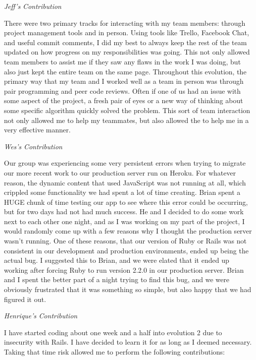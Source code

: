 \documentclass[11pt]{article}
\begin{document}
\textit{Jeff's Contribution}

There were two primary tracks for interacting with my team members: through project management tools and in person.  Using tools like Trello, Facebook Chat, and useful commit comments, I did my best to always keep the rest of the team updated on how progress on my responsibilities was going.  This not only allowed team members to assist me if they saw any flaws in the work I was doing, but also just kept the entire team on the same page.  Throughout this evolution, the primary way that my team and I worked well as a team in person was through pair programming and peer code reviews.  Often if one of us had an issue with some aspect of the project, a fresh pair of eyes or a new way of thinking about some specific algorithm quickly solved the problem.  This sort of team interaction not only allowed me to help my teammates, but also allowed the to help me in a very effective manner.

\textit{Wes's Contribution}

Our group was experiencing some very persistent errors when trying to migrate our more recent work to our production server run on Heroku.  For whatever reason, the dynamic content that used JavaScript was not running at all, which crippled some functionality we had spent a lot of time creating.  Brian spent a HUGE chunk of time testing our app to see where this error could be occurring, but for two days had not had much success.  He and I decided to do some work next to each other one night, and as I was working on my part of the project, I would randomly come up with a few reasons why I thought the production server wasn’t running.  One of these reasons, that our version of Ruby or Rails was not consistent in our development and production environments, ended up being the actual bug.  I suggested this to Brian, and we were elated that it ended up working after forcing Ruby to run version 2.2.0 in our production server.  Brian and I spent the better part of a night trying to find this bug, and we were obviously frustrated that it was something so simple, but also happy that we had figured it out.

\textit{Henrique's Contribution}

I have started coding about one week and a half into evolution 2 due to insecurity with Rails. I have decided to learn it for as long as I deemed necessary. Taking that time risk allowed me to perform the following contributions:
\end{document}
